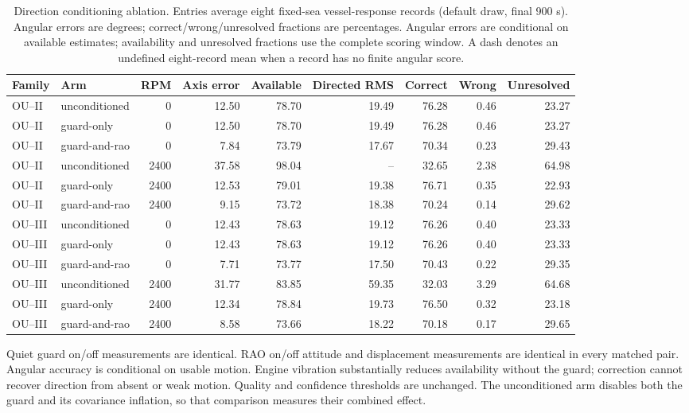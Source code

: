 \begin{table}[t]\centering\footnotesize
\caption{Direction conditioning ablation. Entries average eight fixed-sea vessel-response records
(default draw, final 900 s). Angular errors are degrees; correct/wrong/unresolved
fractions are percentages. Angular errors are conditional on available estimates;
availability and unresolved fractions use the complete scoring window.
A dash denotes an undefined eight-record mean when a record has no finite angular score.}
\label{tab:direction-rao-ablation}
\begin{tabular}{@{}llrrrrrrr@{}}\toprule
Family & Arm & RPM & Axis error & Available & Directed RMS & Correct & Wrong & Unresolved \\
\midrule
OU--II & unconditioned & 0 & 12.50 & 78.70 & 19.49 & 76.28 & 0.46 & 23.27 \\
OU--II & guard-only & 0 & 12.50 & 78.70 & 19.49 & 76.28 & 0.46 & 23.27 \\
OU--II & guard-and-rao & 0 & 7.84 & 73.79 & 17.67 & 70.34 & 0.23 & 29.43 \\
OU--II & unconditioned & 2400 & 37.58 & 98.04 & -- & 32.65 & 2.38 & 64.98 \\
OU--II & guard-only & 2400 & 12.53 & 79.01 & 19.38 & 76.71 & 0.35 & 22.93 \\
OU--II & guard-and-rao & 2400 & 9.15 & 73.72 & 18.38 & 70.24 & 0.14 & 29.62 \\
OU--III & unconditioned & 0 & 12.43 & 78.63 & 19.12 & 76.26 & 0.40 & 23.33 \\
OU--III & guard-only & 0 & 12.43 & 78.63 & 19.12 & 76.26 & 0.40 & 23.33 \\
OU--III & guard-and-rao & 0 & 7.71 & 73.77 & 17.50 & 70.43 & 0.22 & 29.35 \\
OU--III & unconditioned & 2400 & 31.77 & 83.85 & 59.35 & 32.03 & 3.29 & 64.68 \\
OU--III & guard-only & 2400 & 12.34 & 78.84 & 19.73 & 76.50 & 0.32 & 23.18 \\
OU--III & guard-and-rao & 2400 & 8.58 & 73.66 & 18.22 & 70.18 & 0.17 & 29.65 \\
\bottomrule\end{tabular}\end{table}
Quiet guard on/off measurements are identical. RAO on/off attitude and displacement measurements are identical in every matched pair. Angular accuracy is conditional on usable motion. Engine vibration substantially reduces availability without the guard; correction cannot recover direction from absent or weak motion. Quality and confidence thresholds are unchanged. The unconditioned arm disables both the guard and its covariance inflation, so that comparison measures their combined effect.

